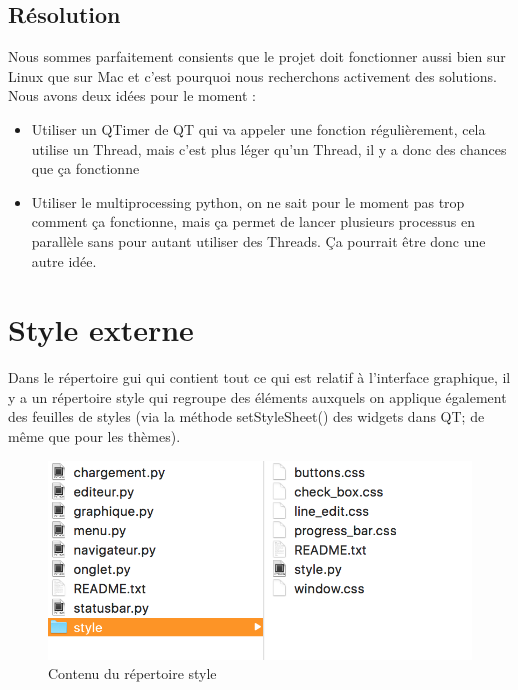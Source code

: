 \documentclass[a4paper,12pt]{article}
\begin{document}
			\subsection*{Résolution}
			
			Nous sommes parfaitement consients que le projet doit fonctionner aussi bien sur Linux que sur Mac et c'est pourquoi nous recherchons activement des solutions.\\
			
			Nous avons deux idées pour le moment :
			\begin{itemize}
				\item Utiliser un QTimer de QT qui va appeler une fonction régulièrement, cela utilise un Thread, mais c'est plus léger qu'un Thread, il y a donc des chances que ça fonctionne
				
				\item Utiliser le multiprocessing python, on ne sait pour le moment pas trop comment ça fonctionne, mais ça permet de lancer plusieurs processus en parallèle sans pour autant utiliser des Threads. Ça pourrait être donc une autre idée. 
			\end{itemize}
		
	\section{Style externe}
	
		Dans le répertoire gui qui contient tout ce qui est relatif à l'interface graphique, il y a un répertoire style qui regroupe des éléments auxquels on applique également des feuilles de styles (via la méthode setStyleSheet() des widgets dans QT; de même que pour les thèmes).
		\begin{figure}[h!]
			\begin{center}
				\includegraphics[scale=1]{imgs/style}
				\caption{Contenu du répertoire style}
			\end{center}
		\end{figure}
				
\end{document}
